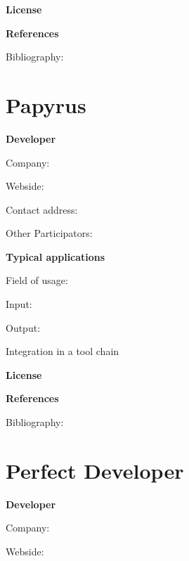 \documentclass{./template/openetcs_report}
\begin{document}


	\textbf{License}


	\textbf{References}

	Bibliography:


\section{Papyrus}

	\textbf{Developer}

	Company: 

	Webside:

	Contact address:

	Other  Participators:



	\textbf{Typical applications}

	Field of usage:


	Input:

	Output:





	Integration in a tool chain



	\textbf{License}


	\textbf{References}

	Bibliography:


\section{Perfect Developer}

	\textbf{Developer}

	Company: 

	Webside:
\end{document}
